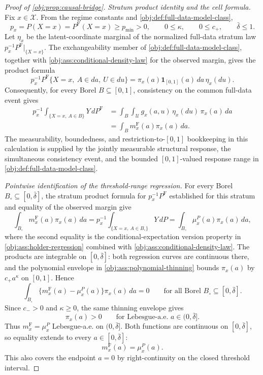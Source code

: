 \documentclass[11pt]{article}
\begin{document}
\begin{proof}[Proof of \cref{obj:prop:causal-bridge}]
\emph{Stratum product identity and the cell formula.}
Fix \(x\in\mathcal X\).  From the regime constants and \cref{obj:def:full-data-model-class},
\[
p_x=P(X=x)=P^{\mathrm F}(X=x)\ge p_{\min}>0,
\qquad
0\le \kappa,\qquad 0\le c_+,\qquad \bar\delta\le 1 .
\]
Let \(\eta_x\) be the latent-coordinate marginal of the normalized full-data
stratum law \(p_x^{-1}P^{\mathrm F}|_{\{X=x\}}\).  The exchangeability member of
\cref{obj:def:full-data-model-class}, together with \cref{obj:ass:conditional-density-law}
for the observed margin, gives the product formula
\[
p_x^{-1}P^{\mathrm F}\{X=x,\ A\in da,\ U\in du\}
=
\pi_x(a)\mathbf 1_{[0,1]}(a)\,da\,\eta_x(du).
\]
Consequently, for every Borel \(B\subseteq[0,1]\), consistency on the common
full-data event gives
\[
\begin{aligned}
p_x^{-1}\int_{\{X=x,\ A\in B\}}Y\,dP^{\mathrm F}
&=
\int_B\int_{\mathcal U}g_x(a,u)\,\eta_x(du)\,\pi_x(a)\,da  \\
&=
\int_B m_x^{\mathrm F}(a)\pi_x(a)\,da .
\end{aligned}
\]
The measurability, boundedness, and restriction-to-\([0,1]\) bookkeeping in
this calculation is supplied by the jointly measurable structural response,
the simultaneous consistency event, and the bounded \([0,1]\)-valued response
range in \cref{obj:def:full-data-model-class}. %

\emph{Pointwise identification of the threshold-range regression.}
For every Borel \(B_\circ\subseteq[0,\bar\delta]\), the stratum product formula for
\(p_x^{-1}P^{\mathrm F}\) established for this stratum and equality of the observed
margin give
\[
\int_{B_\circ}m_x^{\mathrm F}(a)\pi_x(a)\,da
=
p_x^{-1}\int_{\{X=x,\ A\in B_\circ\}}Y\,dP
=
\int_{B_\circ}\mu_x^P(a)\pi_x(a)\,da,
\]
where the second equality is the conditional-expectation version property in
\cref{obj:ass:holder-regression} combined with \cref{obj:ass:conditional-density-law}.
The products are integrable on \([0,\bar\delta]\): both regression curves are
continuous there, and the polynomial envelope in
\cref{obj:ass:polynomial-thinning} bounds \(\pi_x(a)\) by \(c_+a^\kappa\) on
\([0,1]\).  Hence
\[
\int_{B_\circ}\{m_x^{\mathrm F}(a)-\mu_x^P(a)\}\pi_x(a)\,da=0
\qquad
\text{for all Borel }B_\circ\subseteq[0,\bar\delta].
\]
Since \(c_->0\) and \(\kappa\ge0\), the same thinning envelope gives
\[
\pi_x(a)>0
\qquad\text{for Lebesgue-a.e. }a\in(0,\bar\delta].
\]
Thus \(m_x^{\mathrm F}=\mu_x^P\) Lebesgue-a.e. on \((0,\bar\delta]\).  Both
functions are continuous on \([0,\bar\delta]\), so equality extends to every
\(a\in[0,\bar\delta]\):
\[
m_x^{\mathrm F}(a)=\mu_x^P(a).
\]
This also covers the endpoint \(a=0\) by right-continuity on the closed
threshold interval. %


\end{proof}
\end{document}
